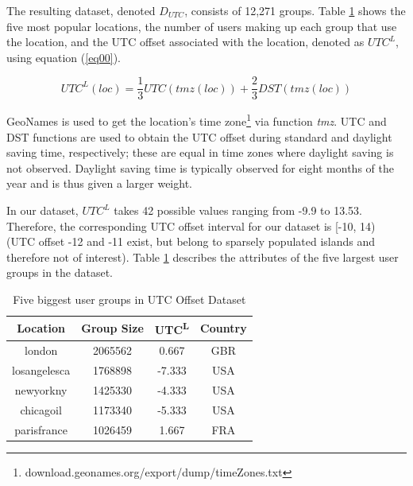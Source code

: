 The resulting dataset, %
denoted $D_{UTC}$, consists of 12,271 groups. Table \ref{table_0} shows the five most popular locations, the number of users making up each group that use the location, and the UTC offset associated with the location, denoted as $UTC^L$, using equation (\ref{eq00}).

\begin{equation}
UTC^L(loc) = \frac{1}{3}UTC(tmz(loc))+\frac{2}{3}DST(tmz(loc))\label{eq00}
\end{equation}

GeoNames is used to get the location's time zone\footnote{download.geonames.org/export/dump/timeZones.txt} via function \textit{tmz}. UTC and DST functions are used to obtain the UTC offset %
during standard and daylight saving time, respectively; these are equal in time zones where daylight saving is not observed.
Daylight saving time is typically observed for eight months of the year and is thus given a larger weight.



In our dataset, $UTC^L$ takes 42 possible values ranging from -9.9 to 13.53. Therefore, the corresponding UTC offset interval for our dataset is [-10, 14) (UTC offset -12 and -11 exist, but belong to sparsely populated islands and therefore not of interest).  Table \ref{table_0} describes the attributes of the five largest user groups in the dataset.

\begin{table}[htbp]
\small
\caption{Five biggest user groups in UTC Offset Dataset}
\label{table_0}
\centering
\begin{tabular}{|c|c|c|c|}
\hline
\bfseries Location & \bfseries Group Size & \bfseries UTC\textsuperscript{L} & \bfseries Country \\
\hline
london & 2065562 & 0.667 & GBR \\
\hline
losangelesca & 1768898 & -7.333 & USA \\
\hline
newyorkny & 1425330 & -4.333 & USA \\
\hline
chicagoil & 1173340 & -5.333 & USA \\
\hline
parisfrance & 1026459 & 1.667 & FRA \\
\hline
\end{tabular}
\end{table}

